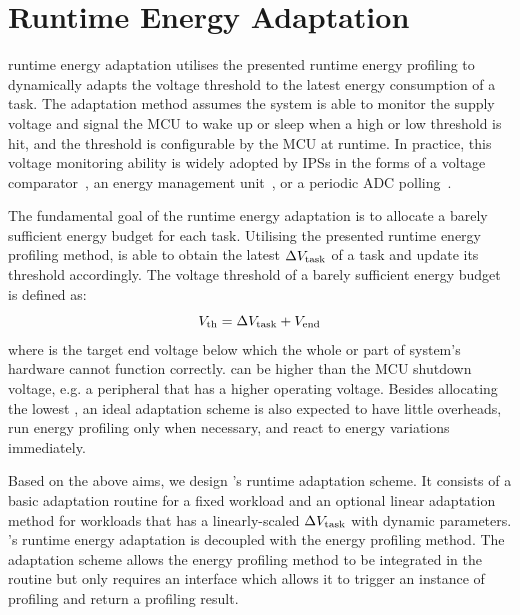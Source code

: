 \section{\nn{} Runtime Energy Adaptation} \label{sec:method2}

\nn{} runtime energy adaptation utilises the presented runtime energy profiling to dynamically adapts the voltage threshold to the latest energy consumption of a task. 
The adaptation method assumes the system is able to monitor the supply voltage and signal the MCU to wake up or sleep when a high or low threshold is hit, and the threshold is configurable by the MCU at runtime. 
In practice, this voltage monitoring ability is widely adopted by IPSs in the forms of a voltage comparator~\cite{kang2018homerun, balsamo2016hibernus++}, an energy management unit~\cite{gomez2016dynamic, maeng2019supporting}, or a periodic ADC polling~\cite{sliper2019efficient}. 

The fundamental goal of the runtime energy adaptation is to allocate a barely sufficient energy budget for each task. 
Utilising the presented runtime energy profiling method, \nn{} is able to obtain the latest $\Delta V_{\text{task}}$ of a task and update its threshold accordingly. 
The voltage threshold  of a barely sufficient energy budget is defined as:
\begin{equation}
    V_{\text{th}} = \Delta V_{\text{task}} + V_{\text{end}}
\end{equation}
where  is the target end voltage below which the whole or part of system's hardware cannot function correctly. 
 can be higher than the MCU shutdown voltage, e.g. a peripheral that has a higher operating voltage. 
Besides allocating the lowest , an ideal adaptation scheme is also expected to have little overheads, run energy profiling only when necessary, and react to energy variations immediately.

Based on the above aims, we design \nn{}'s runtime adaptation scheme. 
It consists of a basic adaptation routine for a fixed workload and an optional linear adaptation method for workloads that has a linearly-scaled $\Delta V_{\text{task}}$ with dynamic parameters.
\nn{}'s runtime energy adaptation is decoupled with the energy profiling method. 
The adaptation scheme allows the energy profiling method to be integrated in the routine but only requires an interface which allows it to trigger an instance of profiling and return a profiling result.



